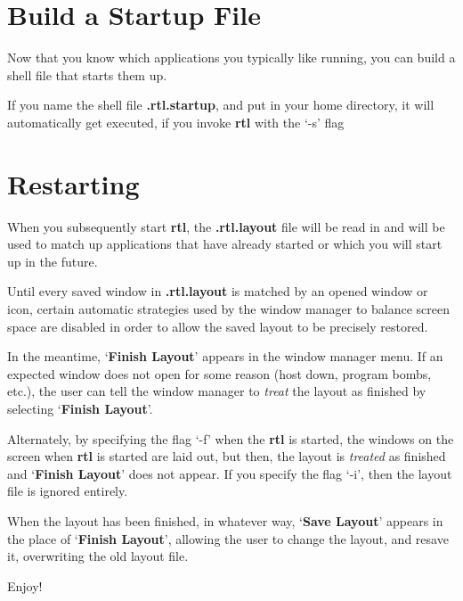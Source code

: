 \section{Build a Startup File}

Now that you know which applications you typically like running, you can
build a shell file that starts them up.

If you name the shell file {\bf .rtl.startup}, and put in your
home directory, it will automatically get executed, if you
invoke {\bf rtl} with the `-s' flag

\section{Restarting}

When you subsequently start {\bf rtl}, the {\bf .rtl.layout} file will be
read in and will be used to match up applications that have already
started or which you will start up in the future.

Until every saved window in
{\bf .rtl.layout} is matched by an opened window or icon,
certain automatic strategies used by the window manager to balance screen
space are disabled in order to allow the saved layout to be precisely
restored.

In the meantime, `{\bf Finish Layout}' appears in the window manager menu.
If an expected window does not open for some reason (host down,
program bombs, etc.), the user can tell the window manager to {\it treat}
the layout as finished by selecting `{\bf Finish Layout}'.

Alternately, by specifying the flag `-f'  when the {\bf rtl} is
started, the windows on the screen when {\bf rtl} is started are laid out,
but then, the layout is {\it treated} as finished and `{\bf Finish Layout}'
does not appear.  If you specify the flag `-i', then the layout file
is ignored entirely.

When the layout has been finished, in whatever way, `{\bf Save
Layout}' appears in the place of `{\bf Finish Layout}', allowing the user
to change the layout, and resave it, overwriting the old layout file.

Enjoy!

